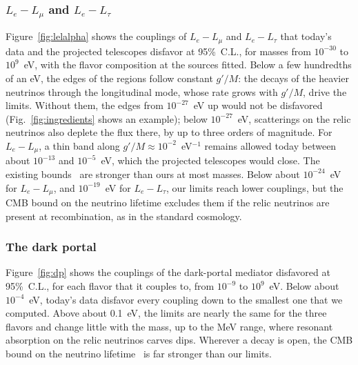 \documentclass[linenumbers, aps, prd, twocolumn, superscriptaddress, floatfix, longbibliography, nofootinbib, bibnotes]{revtex4-2}
\begin{document}
\subsubsection{\texorpdfstring{$L_e - L_\mu$ and $L_e - L_\tau$}{Le - Lmu and Le - Ltau}}
Figure~\ref{fig:lelalpha} shows the couplings of $L_e - L_\mu$ and $L_e - L_\tau$ that today's data and the projected telescopes disfavor at 95\%~C.L., for masses from $10^{-30}$ to $10^9$~eV, with the flavor composition at the sources fitted.
Below a few hundredths of an eV, the edges of the regions follow constant $g'/M$: the decays of the heavier neutrinos through the longitudinal mode, whose rate grows with $g'/M$, drive the limits.
Without them, the edges from $10^{-27}$~eV up would not be disfavored (Fig.~\ref{fig:ingredients} shows an example); below $10^{-27}$~eV, scatterings on the relic neutrinos also deplete the flux there, by up to three orders of magnitude.
For $L_e - L_\mu$, a thin band along $g'/M \approx 10^{-2}$~eV$^{-1}$ remains allowed today between about $10^{-13}$ and $10^{-5}$~eV, which the projected telescopes would close.
The existing bounds~\cite{Bauer:2018onh, Sabti:2019mhn, Dror:2020fbh, Coloma:2020gfv, Garg:2026gwx, Cardenas:2026vop, Baryakhtar:2017ngi, Wise:2018rnb} are stronger than ours at most masses.
Below about $10^{-24}$~eV for $L_e - L_\mu$, and $10^{-19}$~eV for $L_e - L_\tau$, our limits reach lower couplings, but the CMB bound on the neutrino lifetime excludes them if the relic neutrinos are present at recombination, as in the standard cosmology.

\subsubsection{The dark portal}
Figure~\ref{fig:dp} shows the couplings of the dark-portal mediator disfavored at 95\%~C.L., for each flavor that it couples to, from $10^{-9}$ to $10^9$~eV.
Below about $10^{-4}$~eV, today's data disfavor every coupling down to the smallest one that we computed.
Above about 0.1~eV, the limits are nearly the same for the three flavors and change little with the mass, up to the MeV range, where resonant absorption on the relic neutrinos carves dips.
Wherever a decay is open, the CMB bound on the neutrino lifetime~\cite{Escudero:2019gfk} is far stronger than our limits.
\end{document}
